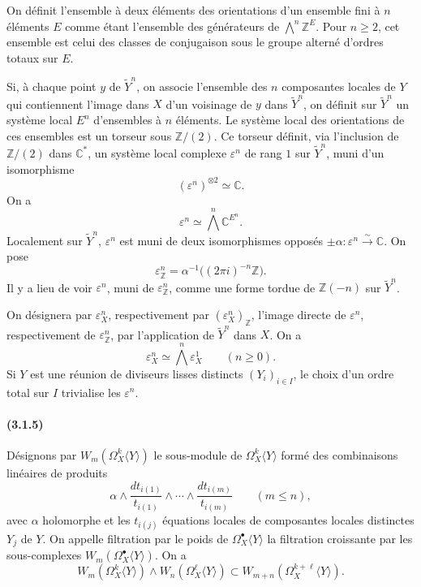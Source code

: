 \documentclass[10pt]{article}
\newcommand{\C}{\mathbb C}
\newcommand{\Z}{\mathbb Z}
\newcommand{\iso}{\xrightarrow{\sim}}
\begin{document}
On définit l'ensemble à deux éléments des orientations d'un ensemble fini à $n$ éléments $E$ comme étant l'ensemble des générateurs de $\bigwedge^n\Z^E$. Pour $n\ge2$, cet ensemble est celui des classes de conjugaison sous le groupe alterné d'ordres totaux sur $E$.

Si, à chaque point $y$ de $\widetilde Y^n$, on associe l'ensemble des $n$ composantes locales de $Y$ qui contiennent l'image dans $X$ d'un voisinage de $y$ dans $\widetilde Y^n$, on définit sur $\widetilde Y^n$ un système local $E^n$ d'ensembles à $n$ éléments. Le système local des orientations de ces ensembles est un torseur sous $\Z/(2)$. Ce torseur définit, via l'inclusion de $\Z/(2)$ dans $\C^*$, un système local complexe $\varepsilon^n$ de rang $1$ sur $\widetilde Y^n$, muni d'un isomorphisme
\[
(\varepsilon^n)^{\otimes2}\simeq\C.
\]
On a
\[
\varepsilon^n\simeq\bigwedge^n\C^{E^n}.
\]
Localement sur $\widetilde Y^n$, $\varepsilon^n$ est muni de deux isomorphismes opposés $\pm\alpha:\varepsilon^n\iso\C$. On pose
\[
\varepsilon_\Z^n=\alpha^{-1}\bigl((2\pi i)^{-n}\Z\bigr).
\]
Il y a lieu de voir $\varepsilon^n$, muni de $\varepsilon_\Z^n$, comme une forme tordue de $\Z(-n)$ sur $\widetilde Y^n$.

On désignera par $\varepsilon_X^n$, respectivement par $(\varepsilon_X^n)_\Z$, l'image directe de $\varepsilon^n$, respectivement de $\varepsilon_\Z^n$, par l'application de $\widetilde Y^n$ dans $X$. On a
\[
\tag{3.1.4.1}
\varepsilon_X^n\simeq\bigwedge^n\varepsilon_X^1\qquad(n\ge0).
\]
Si $Y$ est une réunion de diviseurs lisses distincts $(Y_i)_{i\in I}$, le choix d'un ordre total sur $I$ trivialise les $\varepsilon^n$.

\paragraph{(3.1.5)} Désignons par $W_m(\Omega_X^k\langle Y\rangle)$ le sous-module de $\Omega_X^k\langle Y\rangle$ formé des combinaisons linéaires de produits
\[
\alpha\wedge\frac{dt_{i(1)}}{t_{i(1)}}\wedge\cdots\wedge
\frac{dt_{i(m)}}{t_{i(m)}}\qquad(m\le n),
\]
avec $\alpha$ holomorphe et les $t_{i(j)}$ équations locales de composantes locales distinctes $Y_j$ de $Y$. On appelle filtration par le poids de $\Omega_X^\bullet\langle Y\rangle$ la filtration croissante par les sous-complexes $W_m(\Omega_X^\bullet\langle Y\rangle)$. On a
\[
\tag{3.1.5.1}
W_m(\Omega_X^k\langle Y\rangle)\wedge W_n(\Omega_X^\ell\langle Y\rangle)
\subset W_{m+n}(\Omega_X^{k+\ell}\langle Y\rangle).
\]
\end{document}
